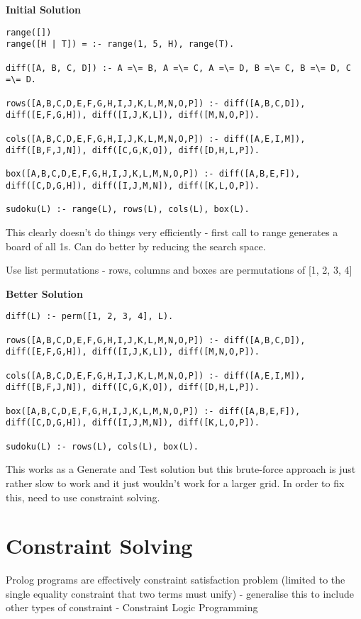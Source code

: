 \documentclass{article}
\begin{document}
\bigskip
\textbf{Initial Solution}
\begin{lstlisting}[frame=single]
range([])
range([H | T]) = :- range(1, 5, H), range(T).

diff([A, B, C, D]) :- A =\= B, A =\= C, A =\= D, B =\= C, B =\= D, C =\= D.

rows([A,B,C,D,E,F,G,H,I,J,K,L,M,N,O,P]) :- diff([A,B,C,D]), diff([E,F,G,H]), diff([I,J,K,L]), diff([M,N,O,P]).

cols([A,B,C,D,E,F,G,H,I,J,K,L,M,N,O,P]) :- diff([A,E,I,M]), diff([B,F,J,N]), diff([C,G,K,O]), diff([D,H,L,P]).

box([A,B,C,D,E,F,G,H,I,J,K,L,M,N,O,P]) :- diff([A,B,E,F]), diff([C,D,G,H]), diff([I,J,M,N]), diff([K,L,O,P]).

sudoku(L) :- range(L), rows(L), cols(L), box(L).
\end{lstlisting}

\bigskip
\noindent
This clearly doesn't do things very efficiently - first call to range generates a board of all 1s. Can do better by reducing the search space.

Use list permutations - rows, columns and boxes are permutations of [1, 2, 3, 4]

\bigskip
\textbf{Better Solution}
\begin{lstlisting}[frame=single]
diff(L) :- perm([1, 2, 3, 4], L).

rows([A,B,C,D,E,F,G,H,I,J,K,L,M,N,O,P]) :- diff([A,B,C,D]), diff([E,F,G,H]), diff([I,J,K,L]), diff([M,N,O,P]).

cols([A,B,C,D,E,F,G,H,I,J,K,L,M,N,O,P]) :- diff([A,E,I,M]), diff([B,F,J,N]), diff([C,G,K,O]), diff([D,H,L,P]).

box([A,B,C,D,E,F,G,H,I,J,K,L,M,N,O,P]) :- diff([A,B,E,F]), diff([C,D,G,H]), diff([I,J,M,N]), diff([K,L,O,P]).

sudoku(L) :- rows(L), cols(L), box(L).
\end{lstlisting}

\bigskip
This works as a Generate and Test solution but this brute-force approach is just rather slow to work and it just wouldn't work for a larger grid. In order to fix this, need to use constraint solving.
	
\section{Constraint Solving}
Prolog programs are effectively constraint satisfaction problem (limited to the single equality constraint that two terms must unify) - generalise this to include other types of constraint - Constraint Logic Programming
\end{document}
